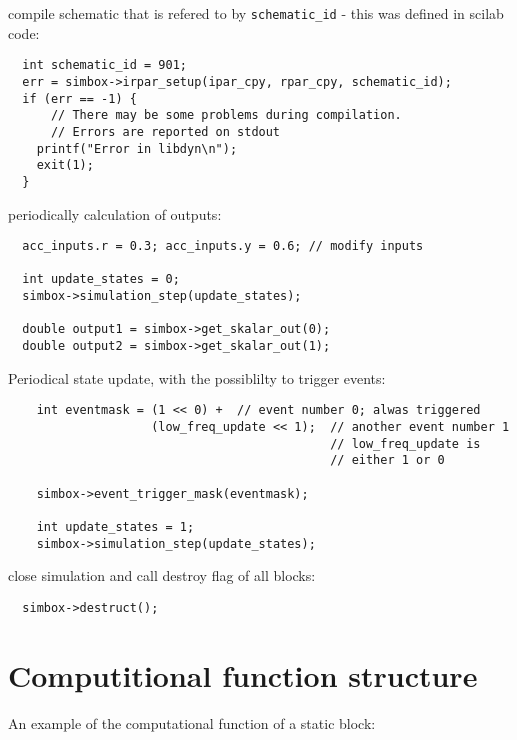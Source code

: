 \documentclass[%
	pdftex,%
	a4paper,%
	oneside,%
	11pt,%
	halfparskip,%
	headsepline,%
	bibtotocnumbered,%
	idxtotoc%
]{scrartcl}
\begin{document}
compile schematic that is refered to by \texttt{schematic\_id} - this was defined in scilab code:

\begin{verbatim}
  int schematic_id = 901;
  err = simbox->irpar_setup(ipar_cpy, rpar_cpy, schematic_id);
  if (err == -1) { 
      // There may be some problems during compilation. 
      // Errors are reported on stdout
    printf("Error in libdyn\n");
    exit(1);
  }
\end{verbatim}

periodically calculation of outputs:

\begin{verbatim}
  acc_inputs.r = 0.3; acc_inputs.y = 0.6; // modify inputs

  int update_states = 0;
  simbox->simulation_step(update_states);

  double output1 = simbox->get_skalar_out(0);
  double output2 = simbox->get_skalar_out(1);  
\end{verbatim}

Periodical state update, with the possiblilty to trigger events:

\begin{verbatim}
    int eventmask = (1 << 0) +  // event number 0; alwas triggered
                    (low_freq_update << 1);  // another event number 1 
                                             // low_freq_update is 
                                             // either 1 or 0

    simbox->event_trigger_mask(eventmask);
    
    int update_states = 1;
    simbox->simulation_step(update_states); 
\end{verbatim}

close simulation and call destroy flag of all blocks:

\begin{verbatim}
  simbox->destruct();
\end{verbatim}


\section{Computitional function structure}

An example of the computational function of a static block:
\end{document}
